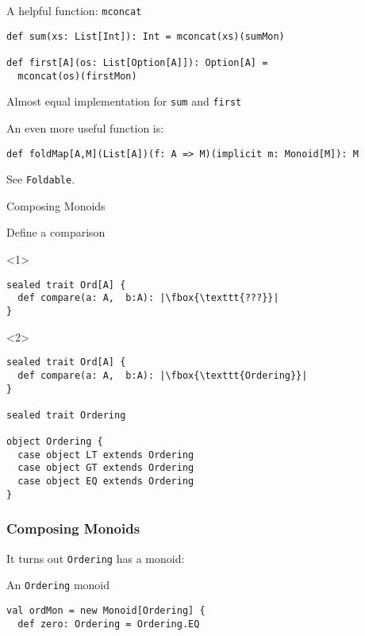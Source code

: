 \documentclass{beamer}
\begin{document}
\begin{framej}
\begin{frame}[fragile]
\begin{block}{A helpful function: \texttt{mconcat}}
\begin{lstlisting}
def sum(xs: List[Int]): Int = mconcat(xs)(sumMon)

def first[A](os: List[Option[A]]): Option[A] =
  mconcat(os)(firstMon)
  \end{lstlisting}
  \end{block}

  Almost equal implementation for \texttt{sum} and \texttt{first}

  An even more useful function is:

  \begin{block}{}
  \begin{lstlisting}
def foldMap[A,M](List[A])(f: A => M)(implicit m: Monoid[M]): M
  \end{lstlisting}
  \end{block}
  See \texttt{Foldable}.
\end{frame}

\begin{frame}[fragile]{Composing Monoids}

  \begin{block}{Define a comparison}
  \begin{onlyenv}<1>
  \begin{lstlisting}[escapechar=\|]
sealed trait Ord[A] {
  def compare(a: A,  b:A): |\fbox{\texttt{???}}|
}
\end{lstlisting}
\end{onlyenv}

\begin{onlyenv}<2>
\begin{lstlisting}[escapechar=\|]
sealed trait Ord[A] {
  def compare(a: A,  b:A): |\fbox{\texttt{Ordering}}|
}

sealed trait Ordering

object Ordering {
  case object LT extends Ordering
  case object GT extends Ordering
  case object EQ extends Ordering
}

  \end{lstlisting}
  \end{onlyenv}
  \end{block}

\end{frame}

\begin{frame}[fragile]
  \frametitle{Composing Monoids}
  It turns out \texttt{Ordering} has a monoid:

  \begin{block}{An \texttt{Ordering} monoid}
  \begin{lstlisting}
val ordMon = new Monoid[Ordering] {
  def zero: Ordering = Ordering.EQ


\end{lstlisting}
\end{block}
\end{frame}
\end{framej}
\end{document}
